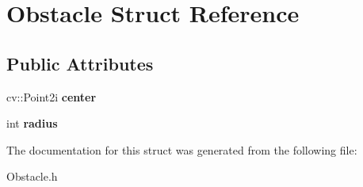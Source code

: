 \hypertarget{struct_obstacle}{}\section{Obstacle Struct Reference}
\label{struct_obstacle}
\subsection*{Public Attributes}
\begin{DoxyCompactItemize}
\item 
\mbox{\label{struct_obstacle_aa0c3141b8d194c87fc9336430d085966}} 
cv\+::\+Point2i {\bfseries center}
\item 
\mbox{\label{struct_obstacle_a81afbabbcc63015ff97d7b36e3c1afc6}} 
int {\bfseries radius}
\end{DoxyCompactItemize}


The documentation for this struct was generated from the following file\+:\begin{DoxyCompactItemize}
\item 
Obstacle.\+h\end{DoxyCompactItemize}
